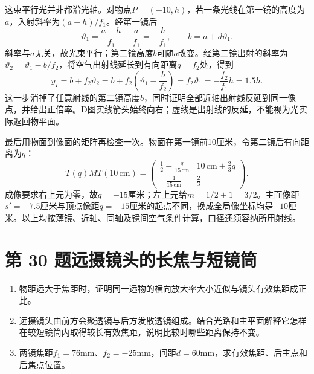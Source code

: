 \documentclass[UTF8,fontset=fandol,a4paper,11pt]{ctexart}
\begin{document}
这束平行光并非都沿光轴。对物点$P=(-10,h)$，若一条光线在第一镜的高度为$a$，入射斜率为$(a-h)/f_1$。经第一镜后
\[
\vartheta_1=\frac{a-h}{f_1}-\frac a{f_1}
=-\frac h{f_1},
\qquad b=a+d\vartheta_1.
\]
斜率与$a$无关，故光束平行；第二镜高度$b$可随$a$改变。经第二镜出射的斜率为$\vartheta_2=\vartheta_1-b/f_2$，将空气出射线延长到有向距离$q=f_2$处，得到
\[
y_I=b+f_2\vartheta_2
=b+f_2\left(\vartheta_1-\frac b{f_2}\right)
=f_2\vartheta_1
=-\frac{f_2}{f_1}h=1.5h.
\]
这一步消掉了任意射线的第二镜高度$b$，同时证明全部近轴出射线反延到同一像点，并给出正倍率。D图实线箭头始终向右；虚线是出射线的反延，不能视为光实际返回物平面。

最后用物面到像面的矩阵再检查一次。物面在第一镜前10厘米，令第二镜后有向距离为$q$：
\[
T(q)MT(10\,\mathrm{cm})
=\begin{pmatrix}
\frac12-\frac{q}{15\,\mathrm{cm}}&
10\,\mathrm{cm}+\frac23q\\
-\frac1{15\,\mathrm{cm}}&\frac23
\end{pmatrix}.
\]
成像要求右上元为零，故$q=-15$厘米；左上元给$m=1/2+1=3/2$。主面像距$s'=-7.5$厘米与顶点像距$q=-15$厘米的起点不同，换成全局像坐标均是$-10$厘米。以上均按薄镜、近轴、同轴及镜间空气条件计算，口径还须容纳所用射线。




\section*{第 30 题\quad 远摄镜头的长焦与短镜筒}\label{q:30}

\begin{enumerate}
\item 物距远大于焦距时，证明同一远物的横向放大率大小近似与镜头有效焦距成正比。
\item 远摄镜头由前方会聚透镜与后方发散透镜组成。结合光路和主平面解释它怎样在较短镜筒内取得较长有效焦距，说明比较时哪些距离保持不变。
\item 两镜焦距$f_1=76$mm、$f_2=-25$mm，间距$d=60$mm，求有效焦距、后主点和后焦点位置。
\end{enumerate}
\end{document}
